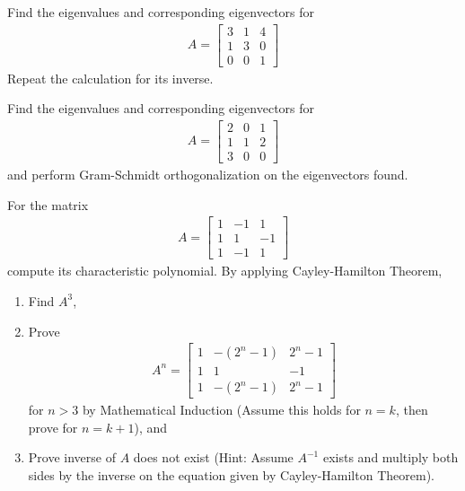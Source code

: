 \begin{Exercise}
Find the eigenvalues and corresponding eigenvectors for
\begin{align*}
A =
\begin{bmatrix}
3 & 1 & 4\\
1 & 3 & 0\\
0 & 0 & 1
\end{bmatrix}
\end{align*}
Repeat the calculation for its inverse.
\end{Exercise}

\begin{Exercise}
Find the eigenvalues and corresponding eigenvectors for
\begin{align*}
A =
\begin{bmatrix}
2 & 0 & 1\\
1 & 1 & 2\\
3 & 0 & 0
\end{bmatrix}
\end{align*}
and perform Gram-Schmidt orthogonalization on the eigenvectors found.
\end{Exercise}

\begin{Exercise}
For the matrix 
\begin{align*}
A = 
\begin{bmatrix}
1 & -1 & 1\\
1 & 1 & -1\\
1 & -1 & 1
\end{bmatrix}
\end{align*}
compute its characteristic polynomial. By applying Cayley-Hamilton Theorem,
\begin{enumerate}[label=(\alph*)]
\item Find $A^{3}$,
\item Prove 
\begin{align*}
A^{n} = \begin{bmatrix}
1 & -(2^n-1) & 2^n-1\\
1 & 1 & -1\\
1 & -(2^n-1) & 2^n-1
\end{bmatrix}
\end{align*}
for $n > 3$ by Mathematical Induction (Assume this holds for $n = k$, then prove for $n = k+1$), and
\item Prove inverse of $A$ does not exist (Hint: Assume $A^{-1}$ exists and multiply both sides by the inverse on the equation given by Cayley-Hamilton Theorem).
\end{enumerate}
\end{Exercise}

